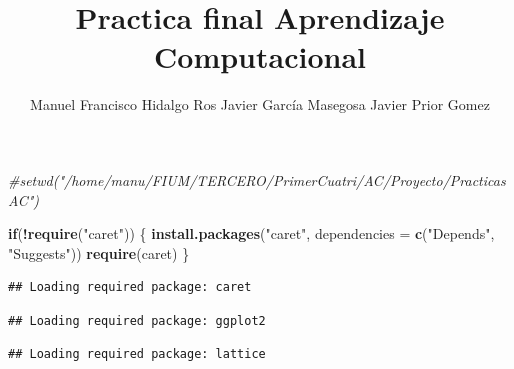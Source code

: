 \documentclass[
]{article}
\title{Practica final Aprendizaje Computacional}
\author{Manuel Francisco Hidalgo Ros Javier García Masegosa Javier Prior
Gomez}
\date{}
\newenvironment{Shaded}{\begin{snugshade}}{\end{snugshade}}
\newcommand{\AttributeTok}[1]{\textcolor[rgb]{0.13,0.29,0.53}{#1}}
\newcommand{\CommentTok}[1]{\textcolor[rgb]{0.56,0.35,0.01}{\textit{#1}}}
\newcommand{\ControlFlowTok}[1]{\textcolor[rgb]{0.13,0.29,0.53}{\textbf{#1}}}
\newcommand{\FunctionTok}[1]{\textcolor[rgb]{0.13,0.29,0.53}{\textbf{#1}}}
\newcommand{\NormalTok}[1]{#1}
\newcommand{\SpecialCharTok}[1]{\textcolor[rgb]{0.81,0.36,0.00}{\textbf{#1}}}
\newcommand{\StringTok}[1]{\textcolor[rgb]{0.31,0.60,0.02}{#1}}
\begin{document}
\maketitle

{
\setcounter{tocdepth}{2}
\tableofcontents
}
\begin{Shaded}
\begin{Highlighting}[]
\CommentTok{\#setwd("/home/manu/FIUM/TERCERO/PrimerCuatri/AC/Proyecto/PracticasAC")}

\ControlFlowTok{if}\NormalTok{(}\SpecialCharTok{!}\FunctionTok{require}\NormalTok{(}\StringTok{"caret"}\NormalTok{)) \{}
  \FunctionTok{install.packages}\NormalTok{(}\StringTok{"caret"}\NormalTok{, }\AttributeTok{dependencies =} \FunctionTok{c}\NormalTok{(}\StringTok{"Depends"}\NormalTok{, }\StringTok{"Suggests"}\NormalTok{))}
  \FunctionTok{require}\NormalTok{(caret)}
\NormalTok{\}}
\end{Highlighting}
\end{Shaded}

\begin{verbatim}
## Loading required package: caret
\end{verbatim}

\begin{verbatim}
## Loading required package: ggplot2
\end{verbatim}

\begin{verbatim}
## Loading required package: lattice
\end{verbatim}
\end{document}
